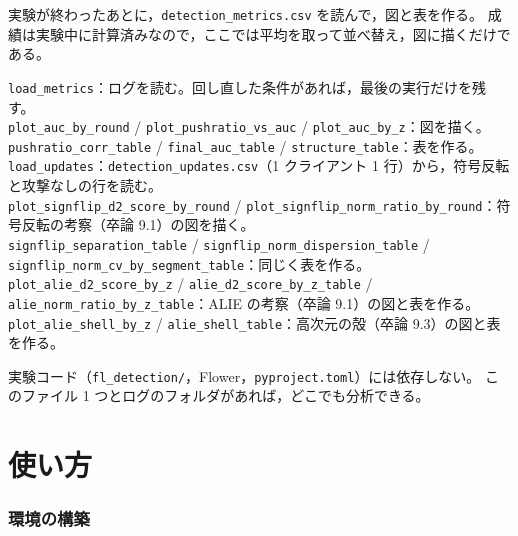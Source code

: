 \documentclass[a4j, dvipdfmx]{jsarticle}  %
\begin{document}
\begin{description}[leftmargin=1.4em, style=nextline]
  \item[役割] 実験が終わったあとに，\texttt{detection\_metrics.csv} を読んで，図と表を作る。
        成績は実験中に計算済みなので，ここでは平均を取って並べ替え，図に描くだけである。
  \item[主な関数]
        \texttt{load\_metrics}：ログを読む。回し直した条件があれば，最後の実行だけを残す。\\
        \texttt{plot\_auc\_by\_round} / \texttt{plot\_pushratio\_vs\_auc} / \texttt{plot\_auc\_by\_z}：図を描く。\\
        \texttt{pushratio\_corr\_table} / \texttt{final\_auc\_table} / \texttt{structure\_table}：表を作る。\\
        \texttt{load\_updates}：\texttt{detection\_updates.csv}（1 クライアント 1 行）から，符号反転と攻撃なしの行を読む。\\
        \texttt{plot\_signflip\_d2\_score\_by\_round} /\allowbreak{} \texttt{plot\_signflip\_norm\_ratio\_by\_round}：符号反転の考察（卒論 9.1）の図を描く。\\
        \texttt{signflip\_separation\_table} /\allowbreak{} \texttt{signflip\_norm\_dispersion\_table} /\allowbreak{} \texttt{signflip\_norm\_cv\_by\_segment\_table}：同じく表を作る。\\
        \texttt{plot\_alie\_d2\_score\_by\_z} /\allowbreak{} \texttt{alie\_d2\_score\_by\_z\_table} /\allowbreak{} \texttt{alie\_norm\_ratio\_by\_z\_table}：ALIE の考察（卒論 9.1）の図と表を作る。\\
        \texttt{plot\_alie\_shell\_by\_z} /\allowbreak{} \texttt{alie\_shell\_table}：高次元の殻（卒論 9.3）の図と表を作る。
  \item[要点] 実験コード（\texttt{fl\_detection/}，Flower，\texttt{pyproject.toml}）には依存しない。
        このファイル 1 つとログのフォルダがあれば，どこでも分析できる。
\end{description}

\part{使い方}
\label{part:usage}

\section{環境の構築}
\label{sec:setup}
\end{document}
